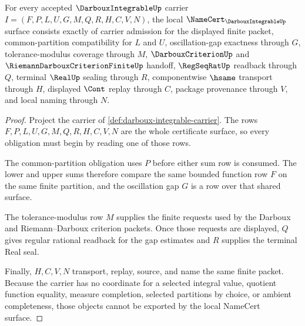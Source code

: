 \begin{theorem}\label{thm:darboux-integrable-namecert-obligations}
For every accepted $\DarbouxIntegrableUp$ carrier $I=(F,P,L,U,G,M,Q,R,H,C,V,N)$, the local $\NameCert_{\DarbouxIntegrableUp}$ surface consists exactly of carrier admission for the displayed finite packet, common-partition compatibility for $L$ and $U$, oscillation-gap exactness through $G$, tolerance-modulus coverage through $M$, $\DarbouxCriterionUp$ and $\RiemannDarbouxCriterionFiniteUp$ handoff, $\RegSeqRatUp$ readback through $Q$, terminal $\RealUp$ sealing through $R$, componentwise $\hsame$ transport through $H$, displayed $\Cont$ replay through $C$, package provenance through $V$, and local naming through $N$.
\end{theorem}
\begin{proof}
Project the carrier of \autoref{def:darboux-integrable-carrier}. The rows $F,P,L,U,G,M,Q,R,H,C,V,N$ are the whole certificate surface, so every obligation must begin by reading one of those rows.

The common-partition obligation uses $P$ before either sum row is consumed. The lower and upper sums therefore compare the same bounded function row $F$ on the same finite partition, and the oscillation gap $G$ is a row over that shared surface.

The tolerance-modulus row $M$ supplies the finite requests used by the Darboux and Riemann--Darboux criterion packets. Once those requests are displayed, $Q$ gives regular rational readback for the gap estimates and $R$ supplies the terminal Real seal.

Finally, $H,C,V,N$ transport, replay, source, and name the same finite packet. Because the carrier has no coordinate for a selected integral value, quotient function equality, measure completion, selected partitions by choice, or ambient completeness, those objects cannot be exported by the local NameCert surface.
\end{proof}


